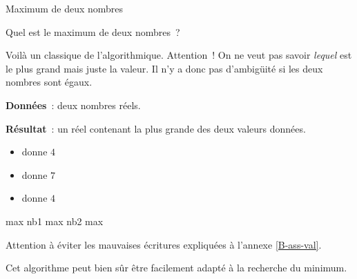 \begin{Fiche}{Maximum de deux nombres}
\label{fiche:max2nb}

	Quel est le maximum de deux nombres~?


	Voilà un classique de l’algorithmique.  Attention~! On ne veut pas savoir
	\emph{lequel} est le plus grand mais juste la valeur.  Il n’y a donc pas
	d’ambigüité si les deux nombres sont égaux.

	\textbf{Données}~: deux nombres réels.
		
	\textbf{Résultat}~: un réel contenant la plus grande des deux valeurs données.

	\begin{center}	
	\end{center}


	\vspace*{-3mm}
	\begin{multicols}{3}
		\begin{itemize}
		\item {} donne $4$
		\item {} donne $7$
		\item {} donne $4$
		\end{itemize}
	\end{multicols}
	\vspace*{-6mm}
	

	\begin{pseudocode}
			\Let max \Gets nb1
		\Else
			\Let max \Gets nb2
		\EndIf
		\Return max
	\EndAlgo
	\end{pseudocode}

	Attention à éviter les mauvaises écritures 
	expliquées à l’annexe \vref{B-ass-val}.

	

	Cet algorithme peut bien sûr être facilement adapté à la recherche du
	minimum.
		
\end{Fiche}
